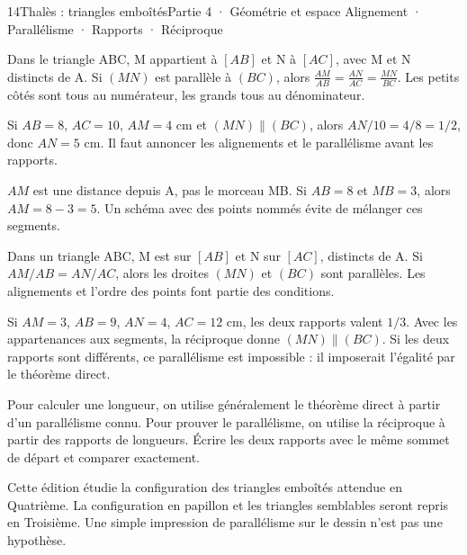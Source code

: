 \begin{ouverture}[geometrie]{14}{Thalès : triangles emboîtés}{Partie 4 · Géométrie et espace}
{Alignement · Parallélisme · Rapports · Réciproque}
\end{ouverture}
\pagestyle{otMain}\essentiel\fontsize{11}{15}\selectfont
{}\label{cours-14-1}
\begin{propriete}Dans le triangle ABC, M appartient à $[AB]$ et N à $[AC]$, avec M et N distincts de A. Si $(MN)$ est parallèle à $(BC)$, alors $\frac{AM}{AB}=\frac{AN}{AC}=\frac{MN}{BC}$. Les petits côtés sont tous au numérateur, les grands tous au dénominateur.\end{propriete}
\label{fig-cours-14-1-cours-thales}

\begin{exemple}Si $AB=8$, $AC=10$, $AM=4$ cm et $(MN)\parallel(BC)$, alors $AN/10=4/8=1/2$, donc $AN=5$ cm. Il faut annoncer les alignements et le parallélisme avant les rapports.\end{exemple}
\begin{attention}$AM$ est une distance depuis A, pas le morceau MB. Si $AB=8$ et $MB=3$, alors $AM=8-3=5$. Un schéma avec des points nommés évite de mélanger ces segments.\end{attention}
\clearpage
{}\label{cours-14-2}
\begin{propriete}[Réciproque]Dans un triangle ABC, M est sur $[AB]$ et N sur $[AC]$, distincts de A. Si $AM/AB=AN/AC$, alors les droites $(MN)$ et $(BC)$ sont parallèles. Les alignements et l’ordre des points font partie des conditions.\end{propriete}
\begin{exemple}Si $AM=3$, $AB=9$, $AN=4$, $AC=12$ cm, les deux rapports valent $1/3$. Avec les appartenances aux segments, la réciproque donne $(MN)\parallel(BC)$. Si les deux rapports sont différents, ce parallélisme est impossible : il imposerait l’égalité par le théorème direct.\end{exemple}
\begin{savoirfaire}Pour calculer une longueur, on utilise généralement le théorème direct à partir d’un parallélisme connu. Pour prouver le parallélisme, on utilise la réciproque à partir des rapports de longueurs. Écrire les deux rapports avec le même sommet de départ et comparer exactement.\end{savoirfaire}
\begin{attention}Cette édition étudie la configuration des triangles emboîtés attendue en Quatrième. La configuration en papillon et les triangles semblables seront repris en Troisième. Une simple impression de parallélisme sur le dessin n’est pas une hypothèse.\end{attention}


